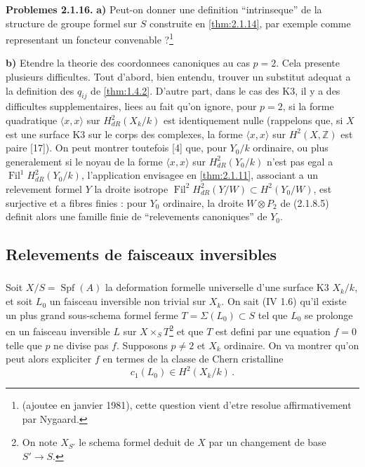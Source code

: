 \documentclass[12pt,a4paper]{article}
\theoremstyle{plain}
\theoremstyle{definition}
\theoremstyle{remark}
\DeclareMathOperator{\Spf}{Spf}
\DeclareMathOperator{\Fil}{Fil}
\begin{document}
\textbf{Problemes 2.1.16.} \textbf{a)} Peut-on donner une definition ``intrinseque'' de la structure de groupe formel sur $S$ construite en \ref{thm:2.1.14}, par exemple comme representant un foncteur convenable ?\footnote{(ajoutee en janvier 1981), cette question vient d'etre resolue affirmativement par Nygaard.}

\textbf{b)} Etendre la theorie des coordonnees canoniques au cas $p = 2$. Cela presente plusieurs difficultes. Tout d'abord, bien entendu, trouver un substitut adequat a la definition des $q_{ij}$ de \ref{thm:1.4.2}. D'autre part, dans le cas des K3, il y a des difficultes supplementaires, liees au fait qu'on ignore, pour $p = 2$, si la forme quadratique $\langle x, x\rangle$ sur $H_{dR}^2(X_k/k)$ est identiquement nulle (rappelons que, si $X$ est une surface K3 sur le corps des complexes, la forme $\langle x, x\rangle$ sur $H^2(X, \mathbb{Z})$ est paire [17]). On peut montrer toutefois [4] que, pour $Y_0/k$ ordinaire, ou plus generalement si le noyau de la forme $\langle x, x\rangle$ sur $H_{dR}^2(Y_0/k)$ n'est pas egal a $\Fil^1H_{dR}^2(Y_0/k)$, l'application envisagee en \ref{thm:2.1.11}, associant a un relevement formel $Y$ la droite isotrope $\Fil^2H_{dR}^2(Y/W) \subset H^2(Y_0/W)$, est surjective et a fibres finies : pour $Y_0$ ordinaire, la droite $W \otimes P_2$ de (2.1.8.5) definit alors une famille finie de ``relevements canoniques'' de $Y_0$.

\subsection{Relevements de faisceaux inversibles}

\subsubsection{}

Soit $X/S = \Spf(A)$ la deformation formelle universelle d'une surface K3 $X_k/k$, et soit $L_0$ un faisceau inversible non trivial sur $X_k$. On sait (IV 1.6) qu'il existe un plus grand sous-schema formel ferme $T = \Sigma(L_0) \subset S$ tel que $L_0$ se prolonge en un faisceau inversible $L$ sur $X \times_S T$\footnote{On note $X_{S'}$ le schema formel deduit de $X$ par un changement de base $S' \to S$.} et que $T$ est defini par une equation $f = 0$ telle que $p$ ne divise pas $f$. Supposons $p \neq 2$ et $X_k$ ordinaire. On va montrer qu'on peut alors expliciter $f$ en termes de la classe de Chern cristalline
\begin{equation}\label{eq:2.2.1.1}
c_1(L_0) \in H^2(X_k/k)\,.\end{equation}
\end{document}
